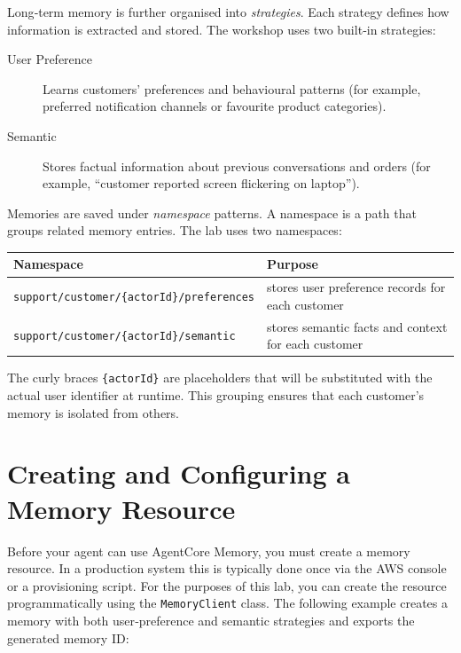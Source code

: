 Long‑term memory is further organised into \emph{strategies}.  Each
strategy defines how information is extracted and stored.  The workshop
uses two built‑in strategies:

\begin{description}
  \item[User Preference] Learns customers’ preferences and behavioural
    patterns (for example, preferred notification channels or favourite
    product categories).
  \item[Semantic] Stores factual information about previous conversations and
    orders (for example, ``customer reported screen flickering on laptop'').
\end{description}

Memories are saved under \emph{namespace} patterns.  A namespace is a path
that groups related memory entries.  The lab uses two namespaces:
\begin{center}
\begin{tabular}{ll}
\textbf{Namespace} & \textbf{Purpose} \\\hline
\texttt{support/customer/\{actorId\}/preferences} & stores user preference
records for each customer \\
\texttt{support/customer/\{actorId\}/semantic} & stores semantic facts and
context for each customer
\end{tabular}
\end{center}

The curly braces \texttt{\{actorId\}} are placeholders that will be
substituted with the actual user identifier at runtime.  This grouping
ensures that each customer’s memory is isolated from others.

\section{Creating and Configuring a Memory Resource}

Before your agent can use AgentCore Memory, you must create a memory
resource.  In a production system this is typically done once via the AWS
console or a provisioning script.  For the purposes of this lab, you can
create the resource programmatically using the \texttt{MemoryClient}
class.  The following example creates a memory with both user‑preference
and semantic strategies and exports the generated memory ID:

